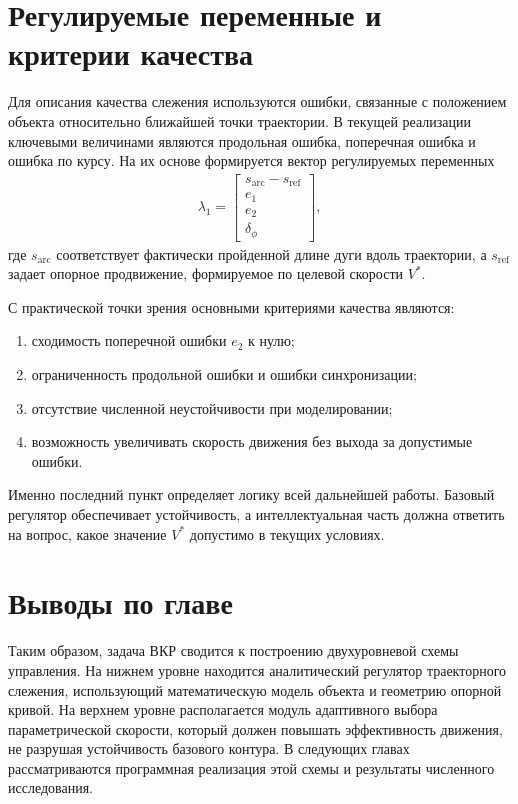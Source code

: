\section{Регулируемые переменные и критерии качества}

Для описания качества слежения используются ошибки, связанные с положением объекта относительно ближайшей точки траектории. В текущей реализации ключевыми величинами являются продольная ошибка, поперечная ошибка и ошибка по курсу. На их основе формируется вектор регулируемых переменных
\begin{gather}
    \lambda_1 =
    \begin{bmatrix}
        s_{\mathrm{arc}} - s_{\mathrm{ref}} \\
        e_1 \\
        e_2 \\
        \delta_{\phi}
    \end{bmatrix},
\end{gather}
где $s_{\mathrm{arc}}$ соответствует фактически пройденной длине дуги вдоль траектории, а $s_{\mathrm{ref}}$ задает опорное продвижение, формируемое по целевой скорости $V^{\ast}$.

С практической точки зрения основными критериями качества являются:
\begin{enumerate}
    \item сходимость поперечной ошибки $e_2$ к нулю;
    \item ограниченность продольной ошибки и ошибки синхронизации;
    \item отсутствие численной неустойчивости при моделировании;
    \item возможность увеличивать скорость движения без выхода за допустимые ошибки.
\end{enumerate}

Именно последний пункт определяет логику всей дальнейшей работы. Базовый регулятор обеспечивает устойчивость, а интеллектуальная часть должна ответить на вопрос, какое значение $V^{\ast}$ допустимо в текущих условиях.

\section{Выводы по главе}

Таким образом, задача ВКР сводится к построению двухуровневой схемы управления. На нижнем уровне находится аналитический регулятор траекторного слежения, использующий математическую модель объекта и геометрию опорной кривой. На верхнем уровне располагается модуль адаптивного выбора параметрической скорости, который должен повышать эффективность движения, не разрушая устойчивость базового контура. В следующих главах рассматриваются программная реализация этой схемы и результаты численного исследования.
